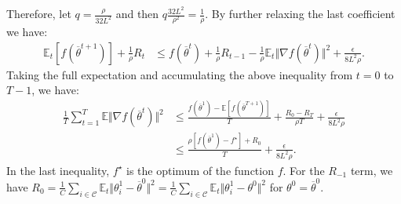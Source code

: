 Therefore, let $q=\frac{\rho}{32L^2}$ and then $q\frac{32L^2}{\rho^2} = \frac{1}{\rho}$. By further relaxing the last coefficient we have:
\begin{align*}
    \mathbb{E}_t\left[f(\overline{\theta}^{t+1})\right] + \frac{1}{\rho}R_t &\leq f(\overline{\theta}^{t}) + \frac{1}{\rho}R_{t-1} - \frac{1}{\rho}\mathbb{E}_t\Vert \nabla f(\overline{\theta}^{t})\Vert^2 + \frac{\epsilon}{8L^2\rho}.
\end{align*}
Taking the full expectation and accumulating the above inequality from $t=0$ to $T-1$, we have:
\begin{align*}
    \frac{1}{T}\sum_{t=1}^{T}\mathbb{E}\Vert\nabla f(\overline{\theta}^{t})\Vert^2 
    &\leq \frac{f(\overline{\theta}^1) - \mathbb{E}\left[f(\overline{\theta}^{T+1})\right]}{T} + \frac{R_{0} - R_{T}}{\rho T} + \frac{\epsilon}{8L^2\rho}\\
    &\leq \frac{\rho\left[ f(\overline{\theta}^1) - f^\star\right] + R_{0}}{T} + \frac{\epsilon}{8L^2\rho}.
\end{align*}
In the last inequality, $f^\star$ is the optimum of the function $f$. For the $R_{-1}$ term, we have $R_{0} = \frac{1}{C}\sum_{i\in\mathcal{C}}\mathbb{E}_t\Vert\theta_i^{1} - \overline{\theta}^{0}\Vert^2 = \frac{1}{C}\sum_{i\in\mathcal{C}}\mathbb{E}_t\Vert\theta_i^{1} - \theta^{0}\Vert^2$ for $\theta^{0} = \overline{\theta}^0$.

